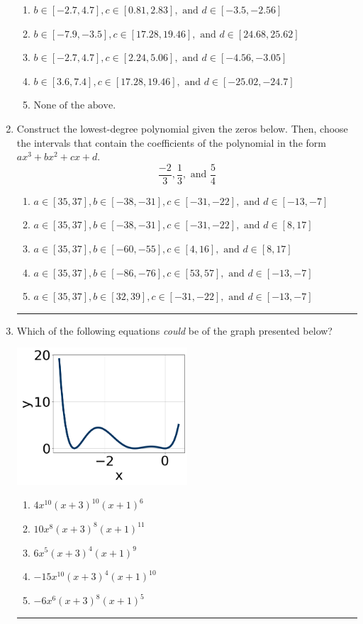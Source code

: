 \documentclass[14pt]{extbook}
\newcommand{\litem}[1]{\item#1\hspace*{-1cm}\rule{\textwidth}{0.4pt}}
\begin{document}
\begin{enumerate}
{\begin{enumerate}[label=\Alph*.]
\item \( b \in [-2.7, 4.7], c \in [0.81, 2.83], \text{ and } d \in [-3.5, -2.56] \)
\item \( b \in [-7.9, -3.5], c \in [17.28, 19.46], \text{ and } d \in [24.68, 25.62] \)
\item \( b \in [-2.7, 4.7], c \in [2.24, 5.06], \text{ and } d \in [-4.56, -3.05] \)
\item \( b \in [3.6, 7.4], c \in [17.28, 19.46], \text{ and } d \in [-25.02, -24.7] \)
\item \( \text{None of the above.} \)

\end{enumerate} }
\litem{
Construct the lowest-degree polynomial given the zeros below. Then, choose the intervals that contain the coefficients of the polynomial in the form $ax^3+bx^2+cx+d$.\[ \frac{-2}{3}, \frac{1}{3}, \text{ and } \frac{5}{4} \]\begin{enumerate}[label=\Alph*.]
\item \( a \in [35, 37], b \in [-38, -31], c \in [-31, -22], \text{ and } d \in [-13, -7] \)
\item \( a \in [35, 37], b \in [-38, -31], c \in [-31, -22], \text{ and } d \in [8, 17] \)
\item \( a \in [35, 37], b \in [-60, -55], c \in [4, 16], \text{ and } d \in [8, 17] \)
\item \( a \in [35, 37], b \in [-86, -76], c \in [53, 57], \text{ and } d \in [-13, -7] \)
\item \( a \in [35, 37], b \in [32, 39], c \in [-31, -22], \text{ and } d \in [-13, -7] \)

\end{enumerate} }
\litem{
Which of the following equations \textit{could} be of the graph presented below?
\begin{center}
    \includegraphics[width=0.5\textwidth]{../Figures/polyGraphToFunctionB.png}
\end{center}
\begin{enumerate}[label=\Alph*.]
\item \( 4x^{10} (x + 3)^{10} (x + 1)^{6} \)
\item \( 10x^{8} (x + 3)^{8} (x + 1)^{11} \)
\item \( 6x^{5} (x + 3)^{4} (x + 1)^{9} \)
\item \( -15x^{10} (x + 3)^{4} (x + 1)^{10} \)
\item \( -6x^{6} (x + 3)^{8} (x + 1)^{5} \)


\end{enumerate}}
\end{enumerate}
\end{document}
